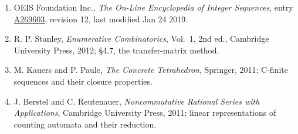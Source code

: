 \documentclass[11pt]{article}
\theoremstyle{definition}
\begin{document}
\begin{enumerate}

\item OEIS Foundation Inc., \emph{The On-Line Encyclopedia of Integer Sequences}, entry \href{https://oeis.org/A269603}{A269603}, revision 12, last modified Jan 24 2019.

\item R. P. Stanley, \emph{Enumerative Combinatorics}, Vol.~1, 2nd ed., Cambridge University Press, 2012; \S4.7, the transfer-matrix method.

\item M. Kauers and P. Paule, \emph{The Concrete Tetrahedron}, Springer, 2011; C-finite sequences and their closure properties.

\item J. Berstel and C. Reutenauer, \emph{Noncommutative Rational Series with Applications}, Cambridge University Press, 2011; linear representations of counting automata and their reduction.

\end{enumerate}
\end{document}
